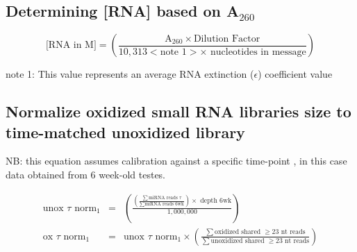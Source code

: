 

\subsection{Determining [RNA] based on A$_{260}$}

  $$
  \mbox{[RNA in M]} = \left( \frac{\mbox{A}_{260} \times \mbox{Dilution Factor}}
                             {10,313 < \mbox{note 1}> \times \mbox{ nucleotides in message}} \right) 
  $$
  
  note 1: This value represents an average RNA extinction ($\epsilon$) coefficient value \\

\subsection{Normalize oxidized small RNA libraries size to time-matched unoxidized library}

NB: this equation assumes calibration against a specific time-point ,
in this case data obtained from 6 week-old testes.

  \begin{eqnarray*}
    \mbox{unox }\tau \mbox{ norm}_1 & = & \left(         
                          \frac{\left( \frac{\displaystyle\sum \mbox{miRNA reads } \tau}{\displaystyle \sum \mbox{miRNA reads 6wk} } \right) \times \mbox{ depth 6wk} }{1,000,000}              
                                            \right)\\
    \mbox{ox }\tau \mbox{ norm}_1 & = &   \mbox{unox }\tau \mbox{ norm}_1 \times
                                   \left(
                                    \frac{\displaystyle \sum \mbox{oxidized shared } \ge \mbox{23 nt reads}}{\displaystyle \sum \mbox{unoxidized shared } \ge \mbox{23 nt reads}}
                                   \right)                                         
    \end{eqnarray*}

